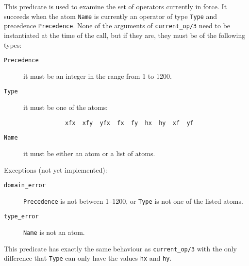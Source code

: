 \begin{description}

    This predicate is used to examine the set of operators currently in force.
    It succeeds when the atom {\tt Name} is currently an operator of type 
    {\tt Type} and precedence {\tt Precedence}.  None of the arguments of
    {\tt current\_op/3} need to be instantiated at the time of the call, 
    but if they are, they must be of the following types:
    \begin{description}
    \item[{\tt Precedence}] 
	it must be an integer in the range from 1 to 1200.
    \item[{\tt Type}]
	it must be one of the atoms:
	\begin{verbatim}
	        xfx  xfy  yfx  fx  fy  hx  hy  xf  yf
	\end{verbatim}
    \item[{\tt Name}]
	it must be either an atom or a list of atoms.
    \end{description}

    Exceptions (not yet implemented):
    \begin{description}
    \item[{\tt domain\_error}]
	{\tt Precedence} is not between 1--1200, or {\tt Type} is not one
	of the listed atoms.
    \item[{\tt type\_error}]
	{\tt Name} is not an atom.
    \end{description}

    This predicate has exactly the same behaviour as {\tt current\_op/3}
    with the only difference that {\tt Type} can only have the values
    {\tt hx} and {\tt hy}.
\end{description}


